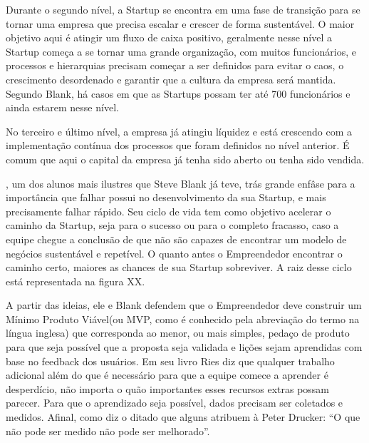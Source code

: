 Durante o segundo nível, a Startup se encontra em uma fase de transição para se tornar uma empresa que precisa escalar e crescer de forma sustentável. O maior objetivo aqui é atingir um fluxo de caixa positivo, geralmente nesse nível a Startup começa a se tornar uma grande organização, com muitos funcionários, e processos e hierarquias precisam começar a ser definidos para evitar o caos, o crescimento desordenado e garantir que a cultura da empresa será mantida. Segundo Blank, há casos em que as Startups possam ter até 700 funcionários e ainda estarem nesse nível.

No terceiro e último nível, a empresa já atingiu líquidez e está crescendo com a implementação contínua dos processos que foram definidos no nível anterior. É comum que aqui o capital da empresa já tenha sido aberto ou tenha sido vendida. 

, um dos alunos mais ilustres que Steve Blank já teve, trás grande enfâse para a importância que falhar possui no desenvolvimento da sua Startup, e mais precisamente falhar rápido. Seu ciclo de vida tem como objetivo acelerar o caminho da Startup, seja para o sucesso ou para o completo fracasso, caso a equipe chegue a conclusão de que não são capazes de encontrar um modelo de negócios sustentável e repetível. O quanto antes o Empreendedor encontrar o caminho certo, maiores as chances de sua Startup sobreviver. A raiz desse ciclo está representada na figura XX.

A partir das ideias, ele e Blank defendem que o Empreendedor deve construir um Mínimo Produto Viável(ou MVP, como é conhecido pela abreviação do termo na língua inglesa) que corresponda ao menor, ou mais simples, pedaço de produto para que seja possível que a proposta seja validada e lições sejam aprendidas com base no feedback dos usuários. Em seu livro Ries diz que qualquer trabalho adicional além do que é necessário para que a equipe comece a aprender é desperdício, não importa o quão importantes esses recursos extras possam parecer. Para que o aprendizado seja possível, dados precisam ser coletados e medidos. Afinal, como diz o ditado que alguns atribuem à Peter Drucker: ``O que não pode ser medido não pode ser melhorado''. 

